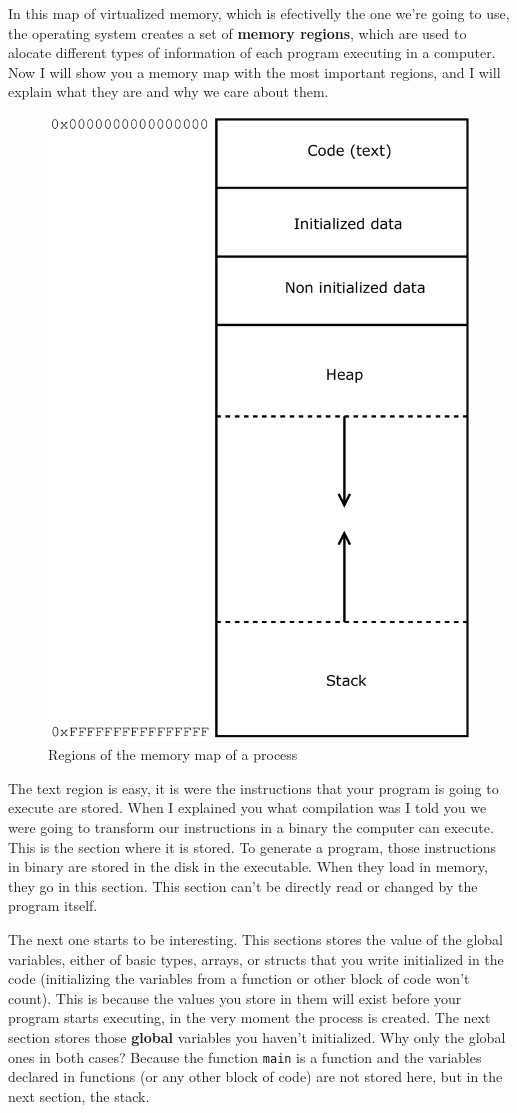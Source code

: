 \documentclass[a4paper]{article}
\begin{document}
In this map of virtualized memory, which is efectivelly the one we're going to
use, the operating system creates a set of \textbf{memory regions}, which are
used to alocate different types of information of each program executing in a
computer.
Now I will show you a memory map with the most important regions, and I will
explain what they are and why we care about them.
\begin{figure}[H]
    \center
    \includegraphics[width=0.5\linewidth]{regionsMemoryMap_en}
    \caption{Regions of the memory map of a process}
    \label{img:regionsMemoryMap}
\end{figure}

The text region is easy, it is were the instructions that your program is going
to execute are stored. When I explained you what compilation was I told you we
were going to transform our instructions in a binary the computer can execute.
This is the section where it is stored. To generate a program, those
instructions in binary are stored in the disk in the executable. When they load
in memory, they go in this section. This section can't be directly read or
changed by the program itself.

The next one starts to be interesting. This sections stores the value of the
global variables, either of basic types, arrays, or structs that you write
initialized in the code (initializing the variables from a function or other
block of code won't count). This is because the values you store in them will
exist before your program starts executing, in the very moment the process is
created. The next section stores those \textbf{global} variables you haven't
initialized. Why only the global ones in both cases? Because the function
\verb!main! is a function and the variables declared in functions (or any other
block of code) are not stored here, but in the next section, the stack.
\end{document}
